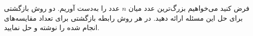     \p 
فرض کنید می‌خواهیم بزرگ‌ترین عدد میان
$n$
عدد را به‌دست آوریم. دو روش بازگشتی برای حل این مسئله ارائه دهید. در هر روش رابطه بازگشتی برای تعداد مقایسه‌های انجام شده را نوشته و حل نمایید.
